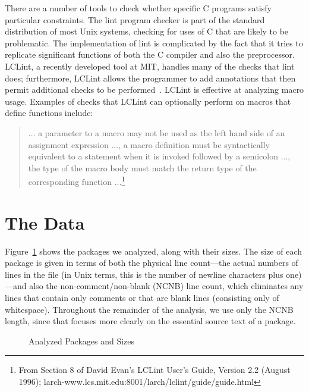There are a number of tools to check whether specific C programs
satisfy particular constraints.  The lint program checker is part of
the standard distribution of most Unix systems, checking for uses of C
that are likely to be problematic.  The implementation of lint is
complicated by the fact that it tries to replicate significant
functions of both the C compiler and also the preprocessor.  LCLint, a
recently developed tool at MIT, handles many of the checks that lint
does; furthermore, LCLint allows the programmer to add annotations
that then permit additional checks to be
performed~\cite{Evans-fse94}\cite{Evans-pldi96}.  LCLint is effective
at analyzing macro usage.  Examples of checks that LCLint can
optionally perform on macros that define functions include:
\begin{quote}
$\ldots$ a parameter to a macro may not be used as the left hand side
of an assignment expression $\ldots$, a macro definition must be
syntactically equivalent to a statement when it is invoked followed by
a semicolon $\ldots$, the type of the macro body must match the return
type of the corresponding function $\ldots$\footnote{From Section 8 of
David Evan's LCLint User's Guide, Version 2.2 (August 1996); larch-www.lcs.mit.edu:8001/larch/lclint/guide/guide.html}
\end{quote}

\section{The Data}\label{sec:gathering}

Figure~\ref{fig:packages} shows the packages we analyzed, along with
their sizes.  The size of each package is given in terms of both the
physical line count---the actual numbers of lines in the file (in Unix
terms, this is the number of newline characters plus one)---and also
the non-comment/non-blank (NCNB) line count, which eliminates any
lines that contain only comments or that are blank lines (consisting
only of whitespace).  Throughout the remainder of the analysis, we use
only the NCNB length, since that focuses more clearly on the essential
source text of a package.

\begin{figure}

\caption{Analyzed Packages and Sizes\label{fig:packages}}
\end{figure}


